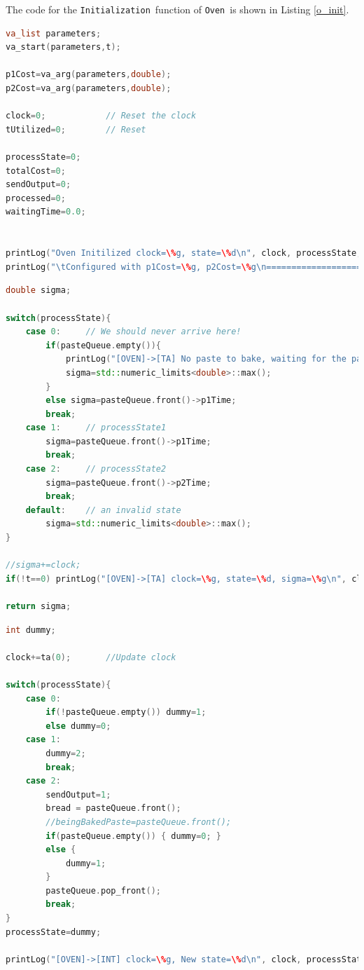 \documentclass[titlepage]{article}%
\newcommand{\oven}{\texttt{Oven}~}
\newcommand{\init}{\texttt{Initialization}~}
\newcommand{\ta}{\texttt{Time Advance}~}
\newcommand{\intt}{\texttt{Internal Transition}~}
\begin{document}
{The code for the \init function of \oven is shown in Listing \ref{o_init}.

\begin{lstlisting}[caption={\init function for \oven}, language=c++, label={o_init}]
va_list parameters;
va_start(parameters,t);

p1Cost=va_arg(parameters,double);
p2Cost=va_arg(parameters,double);

clock=0;			// Reset the clock
tUtilized=0;		// Reset

processState=0;
totalCost=0;
sendOutput=0;
processed=0;
waitingTime=0.0;


printLog("Oven Initilized clock=\%g, state=\%d\n", clock, processState, t);
printLog("\tConfigured with p1Cost=\%g, p2Cost=\%g\n================================================\n\n", p1Cost, p2Cost);

\end{lstlisting}
\begin{lstlisting}[caption={\ta function for \oven}, language=c++, label={o_ta}]
double sigma;

switch(processState){
	case 0:		// We should never arrive here!
		if(pasteQueue.empty()){
			printLog("[OVEN]->[TA] No paste to bake, waiting for the paste INF (state=\%d)\n", processState);		
			sigma=std::numeric_limits<double>::max();
		}
		else sigma=pasteQueue.front()->p1Time;
		break;
	case 1:		// processState1
		sigma=pasteQueue.front()->p1Time;
		break;
	case 2:		// processState2
		sigma=pasteQueue.front()->p2Time;
		break;
	default:	// an invalid state
		sigma=std::numeric_limits<double>::max();
}

//sigma+=clock;
if(!t==0) printLog("[OVEN]->[TA] clock=\%g, state=\%d, sigma=\%g\n", clock, processState,sigma);

return sigma;
\end{lstlisting}

\begin{lstlisting}[caption={\intt function for \oven}, language=c++, label={o_ta}]
int dummy;

clock+=ta(0);		//Update clock

switch(processState){
	case 0:
		if(!pasteQueue.empty()) dummy=1;
		else dummy=0;
	case 1:
		dummy=2;
		break;
	case 2:
		sendOutput=1;	
		bread = pasteQueue.front();			
		//beingBakedPaste=pasteQueue.front();
		if(pasteQueue.empty()) { dummy=0; }
		else {
			dummy=1;			
		}
		pasteQueue.pop_front();
		break;	
}
processState=dummy;

printLog("[OVEN]->[INT] clock=\%g, New state=\%d\n", clock, processState);
\end{lstlisting}

}
\end{document}
